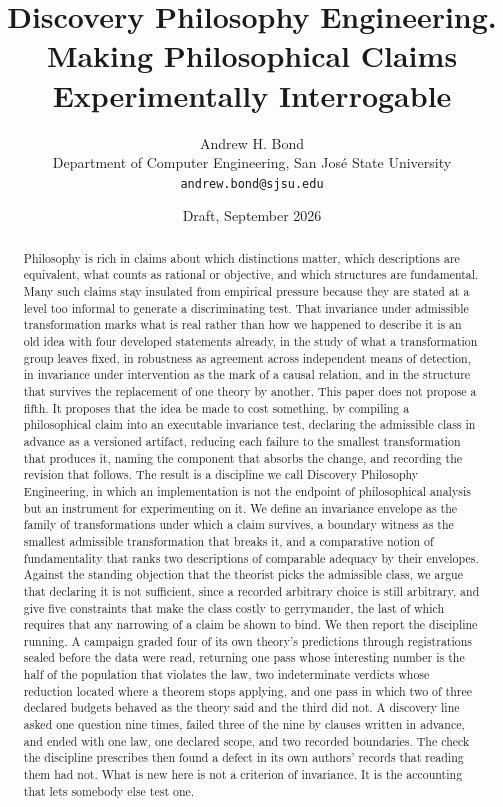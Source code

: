 \documentclass[11pt]{article}
\title{Discovery Philosophy Engineering.\\
Making Philosophical Claims Experimentally Interrogable}
\author{}
\date{}
\author{Andrew H. Bond\\
  Department of Computer Engineering, San Jos\'e State University\\
  \texttt{andrew.bond@sjsu.edu}}
\date{Draft, September 2026}
\theoremstyle{remark}
\begin{document}
\maketitle

\begin{abstract}
Philosophy is rich in claims about which distinctions matter, which descriptions
are equivalent, what counts as rational or objective, and which structures are
fundamental. Many such claims stay insulated from empirical pressure because they
are stated at a level too informal to generate a discriminating test. That
invariance under admissible transformation marks what is real rather than how we
happened to describe it is an old idea with four developed statements already, in
the study of what a transformation group leaves fixed, in robustness as agreement
across independent means of detection, in invariance under intervention as the
mark of a causal relation, and in the structure that survives the replacement of
one theory by another. This paper does not propose a fifth. It proposes that the
idea be made to cost something, by compiling a philosophical claim into an
executable invariance test, declaring the admissible class in advance as a
versioned artifact, reducing each failure to the smallest transformation that
produces it, naming the component that absorbs the change, and recording the
revision that follows. The result is a discipline we call Discovery Philosophy
Engineering, in which an implementation is not the endpoint of philosophical
analysis but an instrument for experimenting on it. We define an invariance
envelope as the family of transformations under which a claim survives, a boundary
witness as the smallest admissible transformation that breaks it, and a
comparative notion of fundamentality that ranks two descriptions of comparable
adequacy by their envelopes. Against the standing objection that the theorist
picks the admissible class, we argue that declaring it is not sufficient, since a
recorded arbitrary choice is still arbitrary, and give five constraints that make
the class costly to gerrymander, the last of which requires that any narrowing of
a claim be shown to bind. We then report the discipline running. A campaign
graded four of its own theory's predictions through registrations sealed before
the data were read, returning one pass whose interesting number is the half of the
population that violates the law, two indeterminate verdicts whose reduction
located where a theorem stops applying, and one pass in which two of three
declared budgets behaved as the theory said and the third did not. A discovery
line asked one question nine times, failed three of the nine by clauses written in
advance, and ended with one law, one declared scope, and two recorded boundaries.
The check the discipline prescribes then found a defect in its own authors'
records that reading them had not. What is new here is not a criterion of
invariance. It is the accounting that lets somebody else test one.
\end{abstract}
\end{document}

